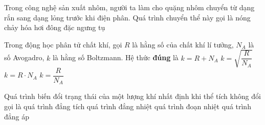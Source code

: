 	\begin{ex}%
		Trong công nghệ sản xuất nhôm, người ta làm cho quặng nhôm chuyển từ dạng rắn sang dạng lỏng trước khi điện phân. Quá trình chuyển thể này gọi là
		\choice
		{\True nóng chảy}
		{hóa hơi}
		{đông đặc}
		{ngưng tụ}
	\end{ex}

	\begin{ex}%
		Trong động học phân tử chất khí, gọi $R$ là hằng số của chất khí lí tưởng, $N_A$ là số Avogadro, $k$ là hằng số Boltzmann. Hệ thức \textbf{đúng} là
		\choice
		{$k=R+N_A$}
		{$k=\sqrt{\dfrac{R}{N_A}}$}
		{$k=R\cdot N_A$}
		{\True $k=\dfrac{R}{N_A}$}
	\end{ex}

	\begin{ex}%
		Quá trình biến đổi trạng thái của một lượng khí nhất định khi thể tích không đổi gọi là
		\choice
		{\True quá trình đẳng tích}
		{quá trình đẳng nhiệt}
		{quá trình đoạn nhiệt}
		{quá trình đẳng áp}
	\end{ex}

